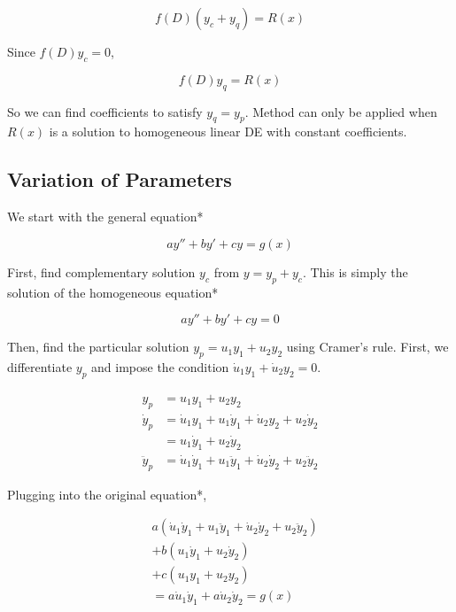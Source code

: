 \begin{equation*}
    f(D)(y_c+y_q)=R(x)
\end{equation*}

Since $f(D)y_c=0$,

\begin{equation*}
    f(D)y_q=R(x)
\end{equation*}

So we can find coefficients to satisfy $y_q=y_p$.
Method can only be applied when $R(x)$ is a solution to homogeneous linear DE with constant coefficients.

\subsection{Variation of Parameters}

We start with the general equation*

\begin{equation*}
    ay''+by'+cy=g(x)
\end{equation*}

First, find complementary solution $y_c$ from $y=y_p+y_c$. This is simply the solution of the homogeneous equation*

\begin{equation*}
    ay''+by'+cy=0
\end{equation*}

Then, find the particular solution $y_p=u_1y_1+u_2y_2$ using Cramer's rule.
First, we differentiate $y_p$ and impose the condition $\dot u_1y_1+\dot u_2y_2=0$.

\begin{align*}
    y_p&=u_1y_1+u_2y_2\\
    \dot y_p&= \dot u_1y_1+u_1\dot y_1+\dot u_2y_2+u_2\dot y_2\\
    &=u_1\dot y_1+u_2\dot y_2\\
    \ddot y_p&=\dot u_1\dot y_1+u_1\ddot y_1+\dot u_2\dot y_2+u_2\ddot y_2
\end{align*}

Plugging into the original equation*,

\begin{align*}
    &a(\dot u_1\dot y_1+u_1\ddot y_1+\dot u_2\dot y_2+u_2\ddot y_2)\\
    &+b(u_1\dot y_1+u_2\dot y_2)\\
    &+c(u_1y_1+u_2y_2)\\
    &=a\dot u_1\dot y_1 + a\dot u_2\dot y_2=g(x)
\end{align*}

